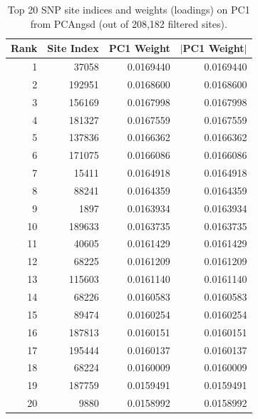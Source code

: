 \documentclass[12pt, a4paper]{article}
\begin{document}
\clearpage

\begin{table}[htbp!]
    \centering
    \caption{Top 20 SNP site indices and weights (loadings) on PC1 from PCAngsd (out of 208,182 filtered sites).}
    \label{tab:top20_snp_weights}
    \small
    \begin{tabular}{rrrr}
        \toprule
        Rank & Site Index & PC1 Weight & $|$PC1 Weight$|$ \\
        \midrule
         1 &  37058 & 0.0169440 & 0.0169440 \\
         2 & 192951 & 0.0168600 & 0.0168600 \\
         3 & 156169 & 0.0167998 & 0.0167998 \\
         4 & 181327 & 0.0167559 & 0.0167559 \\
         5 & 137836 & 0.0166362 & 0.0166362 \\
         6 & 171075 & 0.0166086 & 0.0166086 \\
         7 &  15411 & 0.0164918 & 0.0164918 \\
         8 &  88241 & 0.0164359 & 0.0164359 \\
         9 &   1897 & 0.0163934 & 0.0163934 \\
        10 & 189633 & 0.0163735 & 0.0163735 \\
        11 &  40605 & 0.0161429 & 0.0161429 \\
        12 &  68225 & 0.0161209 & 0.0161209 \\
        13 & 115603 & 0.0161140 & 0.0161140 \\
        14 &  68226 & 0.0160583 & 0.0160583 \\
        15 &  89474 & 0.0160254 & 0.0160254 \\
        16 & 187813 & 0.0160151 & 0.0160151 \\
        17 & 195444 & 0.0160137 & 0.0160137 \\
        18 &  68224 & 0.0160009 & 0.0160009 \\
        19 & 187759 & 0.0159491 & 0.0159491 \\
        20 &   9880 & 0.0158992 & 0.0158992 \\
        \bottomrule
    \end{tabular}
\end{table}

\end{document}
